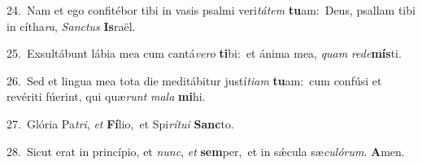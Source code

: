 {\numbfont\textcolor{\numbcolor}{24.}}~Nam et ego confitébor tibi in vasis psalmi veri\-\textit{tá}\-\textit{tem} \textbf{tu}\-am:~\star Deus, psallam tibi in cítha\-\textit{ra}\-, \textit{Sanc}\-\textit{tus} \textbf{Is}\-raël.\par
{\numbfont\textcolor{\numbcolor}{25.}}~Exsultábunt lábia mea cum cantá\-\textit{ve}\-\textit{ro} \textbf{ti}\-bi:~\star et ánima mea, \textit{quam} \textit{red}\-\textit{e}\textbf{mís}ti.\par
{\numbfont\textcolor{\numbcolor}{26.}}~Sed et lingua mea tota die meditábitur justí\-\textit{ti}\-\textit{am} \textbf{tu}\-am:~\star cum confúsi et revériti fúerint, qui quæ\textit{runt} \textit{ma}\-\textit{la} \textbf{mi}\-hi.\par
{\numbfont\textcolor{\numbcolor}{27.}}~Glória Pa\-\textit{tri}\-, \textit{et} \textbf{Fí}\-lio,~\star et Spi\-\textit{rí}\-\textit{tu}\textit{i} \textbf{Sanc}\-to.\par
{\numbfont\textcolor{\numbcolor}{28.}}~Sicut erat in princípio, et \textit{nunc}\-, \textit{et} \textbf{sem}\-per,~\star et in sǽcula sæ\-\textit{cu}\-\textit{ló}\textit{rum}. \textbf{A}\-men.\par
